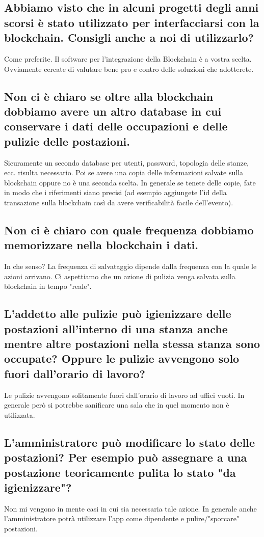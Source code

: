 \subsection*{Abbiamo visto che in alcuni progetti degli anni scorsi è stato utilizzato  per interfacciarsi con la blockchain. Consigli anche a noi di utilizzarlo?}
Come preferite. Il software per l'integrazione della Blockchain è a vostra scelta. Ovviamente cercate di valutare bene pro e contro delle soluzioni che adotterete.
\subsection*{Non ci è chiaro se oltre alla blockchain dobbiamo avere un altro database in cui conservare i dati delle occupazioni e delle pulizie delle postazioni.}
Sicuramente un secondo database per utenti, password, topologia delle stanze, ecc. risulta necessario. Poi se avere una copia delle informazioni salvate sulla blockchain oppure no è una seconda scelta. In generale se tenete delle copie, fate in modo che i riferimenti siano precisi (ad esempio aggiungete l'id della transazione sulla blockchain così da avere verificabilità facile dell'evento).
\subsection*{Non ci è chiaro con quale frequenza dobbiamo memorizzare nella blockchain i dati.}
 In che senso? La frequenza di salvataggio dipende dalla frequenza con la quale le azioni arrivano. Ci aspettiamo che un azione di pulizia venga salvata sulla blockchain in tempo "reale".
\subsection*{L'addetto alle pulizie può igienizzare delle postazioni all'interno di una stanza anche mentre altre postazioni nella stessa stanza sono occupate? Oppure le pulizie avvengono solo fuori dall'orario di lavoro?}
Le pulizie avvengono solitamente fuori dall'orario di lavoro ad uffici vuoti. In generale però si potrebbe sanificare una sala che in quel momento non è utilizzata.
\subsection*{L'amministratore può modificare lo stato delle postazioni? Per esempio può assegnare a una postazione teoricamente pulita lo stato "da igienizzare"?}
Non mi vengono in mente casi in cui sia necessaria tale azione. In generale anche l'amministratore potrà utilizzare l'app come dipendente e pulire/"sporcare" postazioni.

